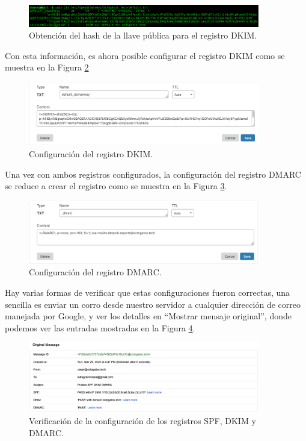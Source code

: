 \documentclass{article}
\begin{document}
\begin{figure}[H]
  \centering
  \includegraphics[width=0.9\textwidth]{email/hashdkim}
  \caption{Obtenci\'on del hash de la llave p\'ublica para
           el registro DKIM.}
  \label{fig:email-hashdkim}
\end{figure}

Con esta informaci\'on, es ahora posible configurar el
registro DKIM como se muestra en la Figura
\ref{fig:email-dkim}

\begin{figure}[H]
  \centering
  \includegraphics[width=0.9\textwidth]{email/dkim}
  \caption{Configuraci\'on del registro DKIM.}
  \label{fig:email-dkim}
\end{figure}

Una vez con ambos registros configurados, la configuraci\'on
del registro DMARC se reduce a crear el registro como se
muestra en la Figura \ref{fig:email-dmarc}.

\begin{figure}[H]
  \centering
  \includegraphics[width=0.9\textwidth]{email/dmarc}
  \caption{Configuraci\'on del registro DMARC.}
  \label{fig:email-dmarc}
\end{figure}

Hay varias formas de verificar que estas configuraciones
fueron correctas, una sencilla es enviar un corro desde
nuestro servidor a cualquier direcci\'on de correo
manejada por Google, y ver los detalles en ``Mostrar
mensaje original'', donde podemos ver las entradas
mostradas en la Figura \ref{fig:email-spfdkimdmarc}.

\begin{figure}[H]
  \centering
  \includegraphics[width=0.9\textwidth]{email/spfdkimdmarc}
  \caption{Verificaci\'on de la configuraci\'on de los
           registros SPF, DKIM y DMARC.}
  \label{fig:email-spfdkimdmarc}
\end{figure}
\end{document}
